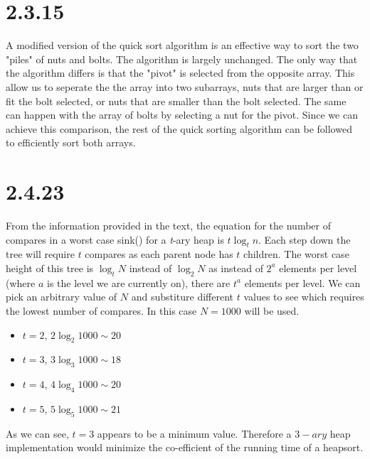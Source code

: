 \documentclass[12pt]{article}
\begin{document}
\section*{2.3.15}

A modified version of the quick sort algorithm is an effective way to sort
the two "piles" of nuts and bolts. The algorithm is largely unchanged. The
only way that the algorithm differs is that the "pivot" is selected from 
the opposite array. This allow us to seperate the the array into two subarrays,
nuts that are larger than or fit the bolt selected, or nuts that are smaller 
than the bolt selected. The same can happen with the array of bolts by selecting
a nut for the pivot. Since we can achieve this comparison, the rest of the 
quick sorting algorithm can be followed to efficiently sort both arrays.

\newpage

\section*{2.4.23}

From the information provided in the text, the equation for the number of
compares in a worst case sink() for a \emph{t}-ary heap is $t\log_t n$. 
Each step down the tree will require $t$ compares as each parent node has
$t$ children. The worst case height of this tree is $\log_t N$ instead of
$\log_2 N$ as instead of $2^a$ elements per level (where $a$ is the level
we are currently on), there are $t^a$ elements per level. We can pick an
arbitrary value of $N$ and substiture different $t$ values to see which 
requires the lowest number of compares. In this case $N = 1000$ will be used.

\begin{itemize}
    \item $t = 2$, $2 \log_2 1000 \sim 20$
    \item $t = 3$, $3 \log_3 1000 \sim 18$
    \item $t = 4$, $4 \log_4 1000 \sim 20$
    \item $t = 5$, $5 \log_5 1000 \sim 21$
\end{itemize}

As we can see, $t=3$ appears to be a minimum value. Therefore a $3-ary$
heap implementation would minimize the co-efficient of the running time of
a heapsort.
\end{document}

